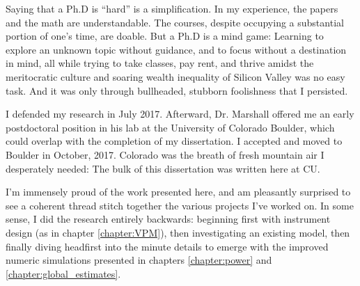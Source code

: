 Saying that a Ph.D is ``hard'' is a simplification. In my experience, the papers and the math are understandable. The courses, despite occupying a substantial portion of one's time, are doable. But a Ph.D is a mind game: Learning to explore an unknown topic without guidance, and to focus without a destination in mind, all while trying to take classes, pay rent, and thrive amidst the meritocratic culture and soaring wealth inequality of Silicon Valley was no easy task. And it was only through bullheaded, stubborn foolishness that I persisted.

I defended my research in July 2017. Afterward, Dr. Marshall offered me an early postdoctoral position in his lab at the University of Colorado Boulder, which could overlap with the completion of my dissertation. I accepted and moved to Boulder in October, 2017. Colorado was the breath of fresh mountain air I desperately needed: The bulk of this dissertation was written here at CU.

I'm immensely proud of the work presented here, and am pleasantly surprised to see a coherent thread stitch together the various projects I've worked on. In some sense, I did the research entirely backwards: beginning first with instrument design (as in chapter \ref{chapter:VPM}), then investigating an existing model, then finally diving headfirst into the minute details to emerge with the improved numeric simulations presented in chapters \ref{chapter:power} and \ref{chapter:global_estimates}.

